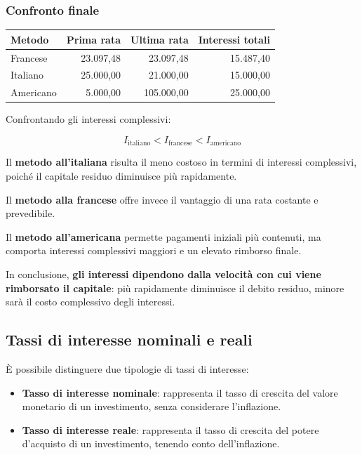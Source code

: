 \subsubsection*{Confronto finale}

\begin{center}
\small
\begin{tabular}{|l|r|r|r|}
\hline
\textbf{Metodo} &
\textbf{Prima rata} &
\textbf{Ultima rata} &
\textbf{Interessi totali} \\
\hline
Francese & 23.097,48 & 23.097,48 & 15.487,40 \\
\hline
Italiano & 25.000,00 & 21.000,00 & 15.000,00 \\
\hline
Americano & 5.000,00 & 105.000,00 & 25.000,00 \\
\hline
\end{tabular}
\end{center}

\noindent Confrontando gli interessi complessivi:

\[
\boxed{
I_{\text{italiano}}
<
I_{\text{francese}}
<
I_{\text{americano}}
}
\]

\noindent Il \textbf{metodo all'italiana} risulta il meno costoso in termini di interessi complessivi, poiché il capitale residuo diminuisce più rapidamente.

\medskip

\noindent Il \textbf{metodo alla francese} offre invece il vantaggio di una rata costante e prevedibile.

\medskip

\noindent Il \textbf{metodo all'americana} permette pagamenti iniziali più contenuti, ma comporta interessi complessivi maggiori e un elevato rimborso finale.

\medskip

\noindent In conclusione, \textbf{gli interessi dipendono dalla velocità con cui viene rimborsato il capitale}: più rapidamente diminuisce il debito residuo, minore sarà il costo complessivo degli interessi.
\subsection{Tassi di interesse nominali e reali}

\noindent È possibile distinguere due tipologie di tassi di interesse:

\begin{itemize}
    \item \textbf{Tasso di interesse nominale}: rappresenta il tasso di crescita del valore monetario di un investimento, senza considerare l'inflazione.

    \item \textbf{Tasso di interesse reale}: rappresenta il tasso di crescita del potere d'acquisto di un investimento, tenendo conto dell'inflazione.
\end{itemize}

